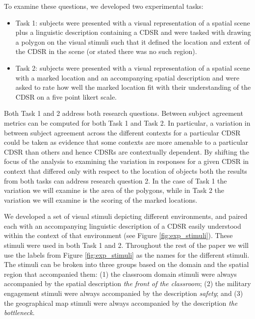 \documentclass[11pt,letterpaper]{article}
\begin{document}
To examine these questions, we developed two experimental tasks:
\begin{itemize}
	\item{Task 1:} subjects were presented with a visual representation of a spatial scene plus a linguistic description containing a CDSR and were tasked with drawing a polygon on the visual stimuli such that it defined the location and extent of the CDSR in the scene (or stated there was no such region).
	\item{Task 2:} subjects were presented with a visual representation of a spatial scene with a marked location and an accompanying spatial description and were asked to rate how well the marked location fit with their understanding of the CDSR on a five point likert scale.
\end{itemize}

Both Task 1 and 2 address both research questions. Between subject agreement metrics can be computed for both Task 1 and Task 2. In particular, a variation in between subject agreement across the different contexts for a particular CDSR could be taken as evidence that some contexts are more amenable to a particular CDSR than others and hence CDSRs are contextually dependent. By shifting the focus of the analysis to examining the variation in responses for a given CDSR in context that differed only with respect to the location of objects both the results from both tasks can address research question 2. In the case of Task 1 the variation we will examine is the area of the polygons, while in Task 2 the variation we will examine is the scoring of the marked locations. 


We developed a set of visual stimuli depicting different environments, and paired each with an accompanying linguistic description of a CDSR easily understood within the context of that environment (see Figure \ref{fig:exp_stimuli}). These stimuli were used in both Task 1 and 2. Throughout the rest of the paper we will use the labels from Figure \ref{fig:exp_stimuli} as the names for the different stimuli. The stimuli can be broken into three groups based on the domain and the spatial region that accompanied them: (1) the classroom domain stimuli were always accompanied by the spatial description \emph{the front of the classroom}; (2) the military engagement stimuli were always accompanied by the description \emph{safety}; and (3) the geographical map stimuli were always accompanied by the description \emph{the bottleneck}.
\end{document}
